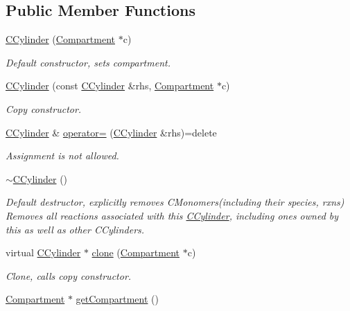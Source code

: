 \subsection*{Public Member Functions}
\begin{DoxyCompactItemize}
\item 
\hyperlink{classCCylinder_a0be01ef2708175a8a147ca45fd290b83}{C\+Cylinder} (\hyperlink{classCompartment}{Compartment} $\ast$c)
\begin{DoxyCompactList}\small\item\em Default constructor, sets compartment. \end{DoxyCompactList}\item 
\hyperlink{classCCylinder_a71863b46b8fee12a2bfb03c12c52f5ee}{C\+Cylinder} (const \hyperlink{classCCylinder}{C\+Cylinder} \&rhs, \hyperlink{classCompartment}{Compartment} $\ast$c)
\begin{DoxyCompactList}\small\item\em Copy constructor. \end{DoxyCompactList}\item 
\hyperlink{classCCylinder}{C\+Cylinder} \& \hyperlink{classCCylinder_a82cdc245e542d14ceab4bb1df061dce4}{operator=} (\hyperlink{classCCylinder}{C\+Cylinder} \&rhs)=delete
\begin{DoxyCompactList}\small\item\em Assignment is not allowed. \end{DoxyCompactList}\item 
\hyperlink{classCCylinder_a715d736c871953942e497290867f591c}{$\sim$\+C\+Cylinder} ()
\begin{DoxyCompactList}\small\item\em Default destructor, explicitly removes C\+Monomers(including their species, rxns) Removes all reactions associated with this \hyperlink{classCCylinder}{C\+Cylinder}, including ones owned by this as well as other C\+Cylinders. \end{DoxyCompactList}\item 
virtual \hyperlink{classCCylinder}{C\+Cylinder} $\ast$ \hyperlink{classCCylinder_a5085f34b8f011a8be07b675a59d16d6f}{clone} (\hyperlink{classCompartment}{Compartment} $\ast$c)
\begin{DoxyCompactList}\small\item\em Clone, calls copy constructor. \end{DoxyCompactList}\item 
\hyperlink{classCompartment}{Compartment} $\ast$ \hyperlink{classCCylinder_ab58156c4f6efbe01ad58540fef073930}{get\+Compartment} ()

\end{DoxyCompactItemize}
